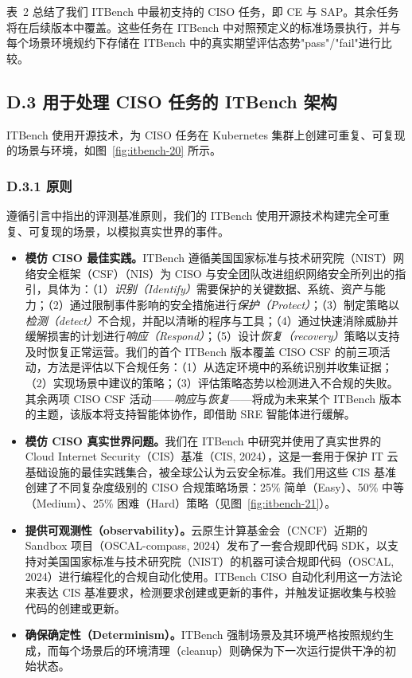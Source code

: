 表~2 总结了我们 ITBench 中最初支持的 CISO 任务，即 CE 与 SAP。其余任务将在后续版本中覆盖。这些任务在 ITBench 中对照预定义的标准场景执行，并与每个场景环境规约下存储在 ITBench 中的真实期望评估态势"pass"/"fail"进行比较。

\subsection{D.3 用于处理 CISO 任务的 ITBench 架构}

ITBench 使用开源技术，为 CISO 任务在 Kubernetes 集群上创建可重复、可复现的场景与环境，如图~\ref{fig:itbench-20} 所示。

\subsubsection{D.3.1 原则}

遵循引言中指出的评测基准原则，我们的 ITBench 使用开源技术构建完全可重复、可复现的场景，以模拟真实世界的事件。

\begin{itemize}
\item \textbf{模仿 CISO 最佳实践。}ITBench 遵循美国国家标准与技术研究院（NIST）网络安全框架（CSF）（NIS）为 CISO 与安全团队改进组织网络安全所列出的指引，具体为：（1）\textit{识别（Identify）}需要保护的关键数据、系统、资产与能力；（2）通过限制事件影响的安全措施进行\textit{保护（Protect）}；（3）制定策略以\textit{检测（detect）}不合规，并配以清晰的程序与工具；（4）通过快速消除威胁并缓解损害的计划进行\textit{响应（Respond）}；（5）设计\textit{恢复（recovery）}策略以支持及时恢复正常运营。我们的首个 ITBench 版本覆盖 CISO CSF 的前三项活动，方法是评估以下合规任务：（1）从选定环境中的系统识别并收集证据；（2）实现场景中建议的策略；（3）评估策略态势以检测进入不合规的失败。其余两项 CISO CSF 活动——\textit{响应}与\textit{恢复}——将成为未来某个 ITBench 版本的主题，该版本将支持智能体协作，即借助 SRE 智能体进行缓解。
\item \textbf{模仿 CISO 真实世界问题。}我们在 ITBench 中研究并使用了真实世界的 Cloud Internet Security（CIS）基准（CIS, 2024），这是一套用于保护 IT 云基础设施的最佳实践集合，被全球公认为云安全标准。我们用这些 CIS 基准创建了不同复杂度级别的 CISO 合规策略场景：25\% 简单（Easy）、50\% 中等（Medium）、25\% 困难（Hard）策略（见图~\ref{fig:itbench-21}）。
\item \textbf{提供可观测性（observability）。}云原生计算基金会（CNCF）近期的 Sandbox 项目（OSCAL-compass, 2024）发布了一套合规即代码 SDK，以支持对美国国家标准与技术研究院（NIST）的机器可读合规即代码（OSCAL, 2024）进行编程化的合规自动化使用。ITBench CISO 自动化利用这一方法论来表达 CIS 基准要求，检测要求创建或更新的事件，并触发证据收集与校验代码的创建或更新。
\item \textbf{确保确定性（Determinism）。}ITBench 强制场景及其环境严格按照规约生成，而每个场景后的环境清理（cleanup）则确保为下一次运行提供干净的初始状态。
\end{itemize}

